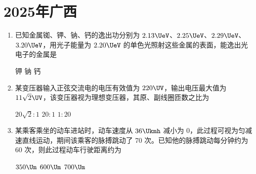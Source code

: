 \documentclass[\gkver]{gaokaozhenti}
\begin{document}
\chapter{2025年广西}

\begin{enumerate}
\item
已知金属铷、钾、钠、钙的逸出功分别为 $2.13 \UeV$、$2.25 \UeV$、$2.29 \UeV$、$3.20 \UeV$，用光子能量为 $2.20 \UeV$ 的单色光照射这些金属的表面，能逸出光电子的金属是

{钾}
{钠}
{钙}


\item
某变压器输入正弦交流电的电压有效值为 $220 \UV$，输出电压最大值为 $11\sqrt{2} \UV$，该变压器视为理想变压器，其原、副线圈匝数之比为

{$20\sqrt{2}:1$}
{$20:1$}
{$1:20$}


\item
某乘客乘坐的动车进站时，动车速度从 $36 \Ukmh$ 减小为 0，此过程可视为匀减速直线运动，期间该乘客的脉搏跳动了 70 次。已知他的脉搏跳动每分钟约为 60 次，则此过程动车行驶距离约为

\fourchoices[answer=B]
{$216 \Um$}
{$350 \Um$}
{$600 \Um$}
{$700 \Um$}


\end{enumerate}
\end{document}
